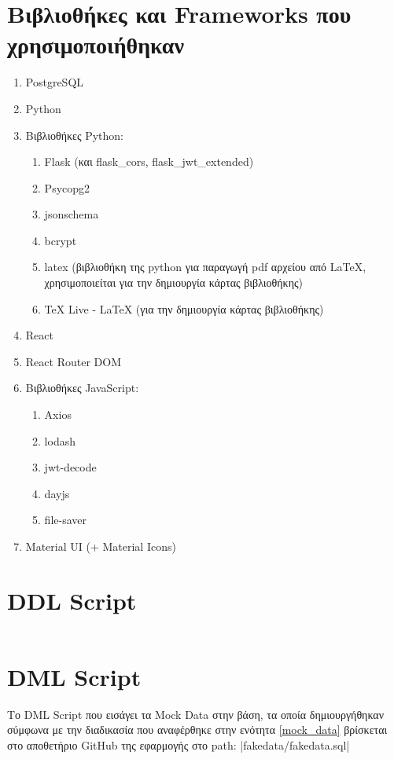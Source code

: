 \documentclass[a4paper]{article}
\begin{document}
\section{Βιβλιοθήκες και Frameworks που χρησιμοποιήθηκαν}
\label{used_software}
\begin{enumerate}
    \item PostgreSQL
    \item Python
    \item Βιβλιοθήκες Python:
    \begin{enumerate}
        \item Flask (και flask\_cors, flask\_jwt\_extended)
        \item Psycopg2
        \item jsonschema
        \item bcrypt
        \item latex (βιβλιοθήκη της python για παραγωγή pdf αρχείου από LaTeX, χρησιμοποιείται για την δημιουργία κάρτας βιβλιοθήκης)
    \item TeX Live - LaTeX (για την δημιουργία κάρτας βιβλιοθήκης)
    \end{enumerate}   
    \item React
    \item React Router DOM
    \item Βιβλιοθήκες JavaScript:
    \begin{enumerate}
        \item Axios
        \item lodash
        \item jwt-decode
        \item dayjs
        \item file-saver
    \end{enumerate}
    \item Material UI (+ Material Icons)
\end{enumerate}

\section{DDL Script}
\label{appendix_ddl}
\inputminted[breaklines,linenos]{sql}{../../sql/schema.sql}

\section{DML Script}

\par Το DML Script που εισάγει τα Mock Data στην βάση, τα οποία δημιουργήθηκαν σύμφωνα με την διαδικασία που αναφέρθηκε στην ενότητα \ref{mock_data} βρίσκεται στο αποθετήριο GitHub της εφαρμογής στο path:
|fakedata/fakedata.sql|
\end{document}
